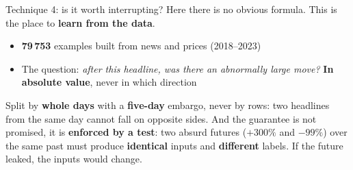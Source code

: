 \documentclass[aspectratio=169]{beamer}
\begin{document}
\begin{frame}{Technique 4: is it worth interrupting?}
Here there is no obvious formula. This is the place to \textbf{learn from the data}.
\vspace{3mm}
\begin{itemize}
  \item \textbf{79\,753} examples built from news and prices (2018--2023)
  \item The question: \emph{after this headline, was there an abnormally large move?}
        \textbf{In absolute value}, never in which direction
\end{itemize}
\vspace{1mm}

\centering
{}
\vspace{3mm}

\raggedright\footnotesize
Split by \textbf{whole days} with a \textbf{five-day} embargo, never by rows: two headlines
from the same day cannot fall on opposite sides. And the guarantee is not promised, it is
\textbf{enforced by a test}: two absurd futures ($+300\%$ and $-99\%$) over the same past must
produce \textbf{identical} inputs and \textbf{different} labels. If the future leaked, the inputs
would change.
\end{frame}
\end{document}
